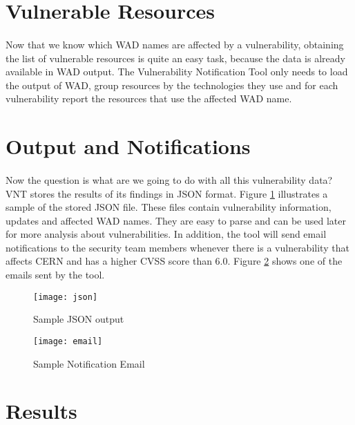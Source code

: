 \section{Vulnerable Resources}
\paragraph{}
Now that we know which WAD names are affected by a vulnerability, obtaining the list of vulnerable resources is quite an easy task, because the data is already available in WAD output. The Vulnerability Notification Tool only needs to load the output of WAD, group resources by the technologies they use and for each vulnerability report the resources that use the affected WAD name.
\section{Output and Notifications}
\paragraph{}

Now the question is what are we going to do with all this vulnerability data? VNT stores the results of its findings in JSON format. Figure \ref{figure:json_output} illustrates a sample of the stored JSON file. These files contain vulnerability information, updates and affected WAD names. They are easy to parse and can be used later for more analysis about vulnerabilities.
In addition, the tool will send email notifications to the security team members whenever there is a vulnerability that affects CERN and has a higher CVSS score than 6.0. Figure \ref{figure:email_output} shows one of the emails sent by the tool.
\\
\begin{figure}[h!]
\label{figure:json_output}
  \centering
    \texttt{[image: json]}
  \caption{Sample JSON output}
\end{figure}

\begin{figure}[h!]
\label{figure:email_output}
  \centering
    \texttt{[image: email]}
  \caption{Sample Notification Email}
\end{figure}


\section{Results}

